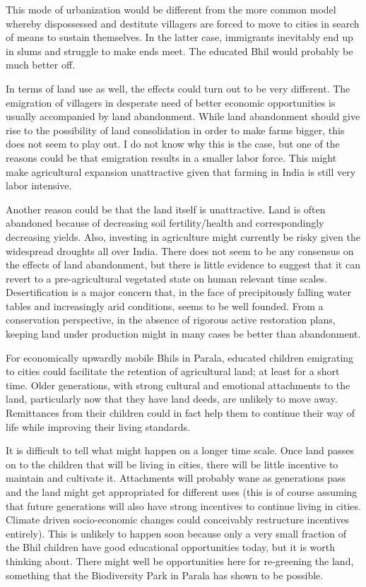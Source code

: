 \documentclass[report.tex]{subfiles}
\begin{document}
This mode of urbanization would be different from the more common model whereby dispossessed and destitute villagers are forced to move to cities in search of means to sustain themselves. In the latter case, immigrants inevitably end up in slums and struggle to make ends meet. The educated Bhil would probably be much better off.

In terms of land use as well, the effects could turn out to be very different. The emigration of villagers in desperate need of better economic opportunities is usually accompanied by land abandonment. While land abandonment should give rise to the possibility of land consolidation in order to make farms bigger, this does not seem to play out. I do not know why this is the case, but one of the reasons could be that emigration results in a smaller labor force. This might make agricultural expansion unattractive given that farming in India is still very labor intensive.

Another reason could be that the land itself is unattractive. Land is often abandoned because of decreasing soil fertility/health and correspondingly decreasing yields. Also, investing in agriculture might currently be risky given the widespread droughts all over India. There does not seem to be any consensus on the effects of land abandonment, but there is little evidence to suggest that it can revert to a pre-agricultural vegetated state on human relevant time scales. Desertification is a major concern that, in the face of precipitously falling water tables and increasingly arid conditions, seems to be well founded. From a conservation perspective, in the absence of rigorous active restoration plans, keeping land under production might in many cases be better than abandonment.

For economically upwardly mobile Bhils in Parala, educated children emigrating to cities could facilitate the retention of agricultural land; at least for a short time. Older generations, with strong cultural and emotional attachments to the land, particularly now that they have land deeds, are unlikely to move away. Remittances from their children could in fact help them to continue their way of life while improving their living standards.

It is difficult to tell what might happen on a longer time scale. Once land passes on to the children that will be living in cities, there will be little incentive to maintain and cultivate it. Attachments will probably wane as generations pass and the land might get appropriated for different uses (this is of course assuming that future generations will also have strong incentives to continue living in cities. Climate driven socio-economic changes could conceivably restructure incentives entirely). This is unlikely to happen soon because only a very small fraction of the Bhil children have good educational opportunities today, but it is worth thinking about. There might well be opportunities here for re-greening the land, something that the Biodiversity Park in Parala has shown to be possible.
\end{document}
